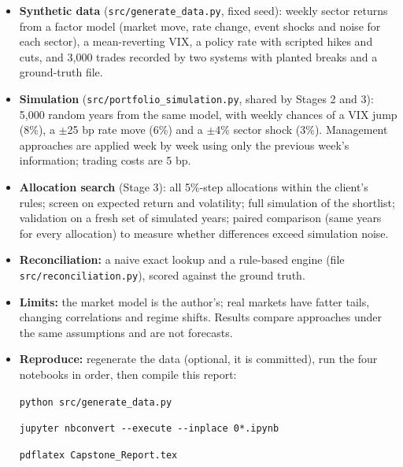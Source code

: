 \documentclass[11pt]{article}
\let\oldheading\heading
\renewcommand{\heading}[1]{\Needspace{8\baselineskip}\oldheading{#1}}
\begin{document}
\newpage
{}
\begin{itemize}[leftmargin=1.5em, itemsep=3pt]
  \item \textbf{Synthetic data} (\texttt{src/generate\_data.py}, fixed
  seed): weekly sector returns from a factor model (market move, rate change,
  event shocks and noise for each sector), a mean-reverting VIX, a policy rate
  with scripted hikes and cuts, and 3,000 trades recorded by two systems with
  planted breaks and a ground-truth file.
  \item \textbf{Simulation} (\texttt{src/portfolio\_simulation.py}, shared by
  Stages 2 and 3): 5,000 random years from the same model, with weekly
  chances of a VIX jump (8\%), a $\pm$25 bp rate move (6\%) and a $\pm$4\%
  sector shock (3\%). Management approaches are applied week by week using
  only the previous week's information; trading costs are 5 bp.
  \item \textbf{Allocation search} (Stage 3): all 5\%-step allocations
  within the client's rules; screen on expected return and volatility;
  full simulation of the shortlist; validation on a fresh set of simulated
  years; paired comparison (same years for every allocation) to measure
  whether differences exceed simulation noise.
  \item \textbf{Reconciliation:} a naive exact lookup and a rule-based engine
  (file \texttt{src/reconciliation.py}), scored against the ground truth.
  \item \textbf{Limits:} the market model is the author's; real markets have
  fatter tails, changing correlations and regime shifts. Results compare
  approaches under the same assumptions and are not forecasts.
  \item \textbf{Reproduce:} regenerate the data (optional, it is committed),
  run the four notebooks in order, then compile this report:\par
  {\small\texttt{python src/generate\_data.py}\par
  \texttt{jupyter nbconvert -{}-execute -{}-inplace 0*.ipynb}\par
  \texttt{pdflatex Capstone\_Report.tex}}
\end{itemize}
\end{document}
